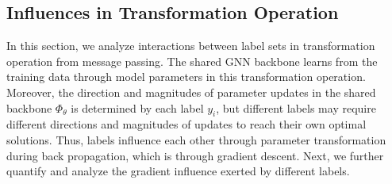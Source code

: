 




\subsection{Influences in Transformation Operation} \label{sec:back}
In this section, we analyze interactions between label sets in transformation operation from message passing.
The shared GNN backbone learns from the training data through model parameters in this transformation operation.
Moreover, the direction and magnitudes of parameter updates in the shared backbone $\Phi_\theta$ is determined by each label $y_i$, but different labels may require different directions and magnitudes of updates to reach their own optimal solutions.
Thus, labels influence each other through parameter transformation during back propagation, which is through gradient descent. 
Next, we further quantify and analyze the gradient influence exerted by different labels.

